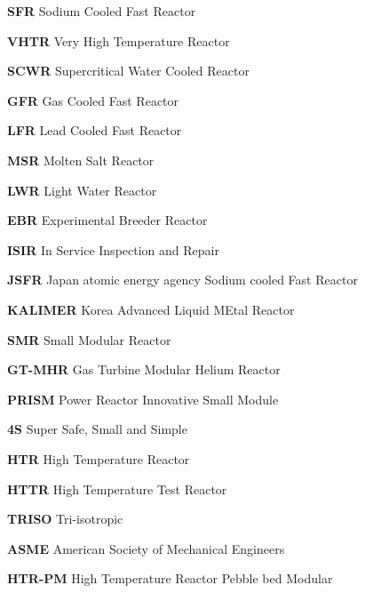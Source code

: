 \documentclass[journal]{IEEEtran}
\begin{document}
\textbf{SFR}  Sodium Cooled Fast Reactor   

\textbf{VHTR}  Very High Temperature Reactor   

\textbf{SCWR}  Supercritical Water Cooled Reactor   

\textbf{GFR}  Gas Cooled Fast Reactor   

\textbf{LFR}   Lead Cooled Fast Reactor   

\textbf{MSR}   Molten Salt Reactor   

\textbf{LWR}   Light Water Reactor  

\textbf{EBR}  Experimental Breeder Reactor  

\textbf{ISIR}  In Service Inspection and Repair  

\textbf{JSFR}  Japan atomic energy agency Sodium cooled Fast Reactor  

\textbf{KALIMER}  Korea Advanced Liquid MEtal Reactor  

\textbf{SMR}  Small Modular Reactor  

\textbf{GT-MHR}  Gas Turbine Modular Helium Reactor  

\textbf{PRISM}  Power Reactor Innovative Small Module  

\textbf{4S}  Super Safe, Small and Simple  

\textbf{HTR}  High Temperature Reactor  

\textbf{HTTR}  High Temperature Test Reactor  

\textbf{TRISO}  Tri-isotropic  

\textbf{ASME}  American Society of Mechanical Engineers  

\textbf{HTR-PM}  High Temperature Reactor Pebble bed Modular  

%
%
\end{document}
